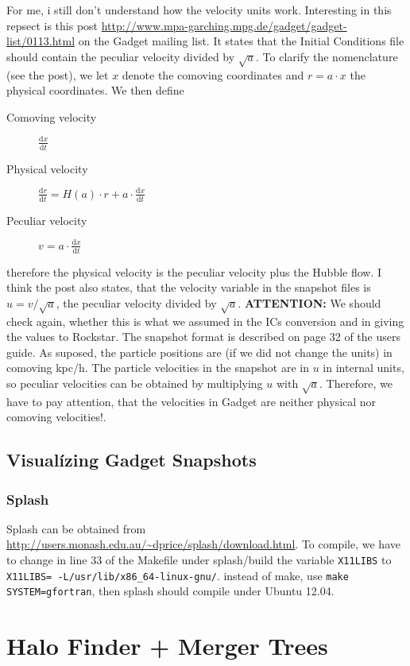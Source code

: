 \documentclass[a4paper,english,10.5pt]{scrartcl}
\begin{document}
For me, i still don't understand how the velocity units work. Interesting in this repsect is this post \url{http://www.mpa-garching.mpg.de/gadget/gadget-list/0113.html} on the Gadget mailing list. It states that the Initial Conditions file should contain the peculiar velocity divided by $\sqrt{a}$. To clarify the nomenclature (see the post), we let $x$ denote the comoving coordinates and $r=a\cdot x$ the physical coordinates. We then define
\begin{description}
 \item[Comoving velocity] $\frac{\textrm{d}x}{\textrm{d}t}$
  \item[Physical velocity] $\frac{\textrm{d}r}{\textrm{d}t} = H(a)\cdot r+a\cdot \frac{\textrm{d}x}{\textrm{d}t}$
  \item[Peculiar velocity] $v = a\cdot \frac{\textrm{d}x}{\textrm{d}t}$ 
\end{description}
therefore the physical velocity is the peculiar velocity plus the Hubble flow. I think the post also states, that the velocity variable in the snapshot files is $u=v/\sqrt{a}$, the peculiar velocity divided by $\sqrt{a}$.
\textbf{ATTENTION:} We should check again, whether this is what we assumed in the ICs conversion and in giving the values to Rockstar.
The snapshot format is described on page 32 of the users guide. As suposed, the particle positions are (if we did not change the units) in comoving kpc/h. The particle velocities in the snapshot are in $u$ in internal units, so peculiar velocities can be obtained by multiplying $u$ with $\sqrt{a}$. Therefore, we have to pay attention, that the velocities in Gadget are neither physical nor comoving velocities!.

\subsection{Visualízing Gadget Snapshots}
\subsubsection{Splash}
Splash can be obtained from \url{http://users.monash.edu.au/~dprice/splash/download.html}. To compile, we have to change in line 33 of the Makefile under splash/build the variable \texttt{X11LIBS} to
\texttt{X11LIBS= -L/usr/lib/x86_64-linux-gnu/}.
instead of make, use \texttt{make SYSTEM=gfortran}, then splash should compile under Ubuntu 12.04.

\section{Halo Finder + Merger Trees}
\end{document}
